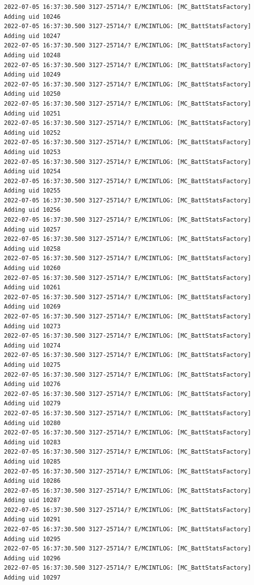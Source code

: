 \documentclass[a4paper,12pt]{book}
\begin{document}
\begin{lstlisting}
2022-07-05 16:37:30.500 3127-25714/? E/MCINTLOG: [MC_BattStatsFactory] Adding uid 10246
2022-07-05 16:37:30.500 3127-25714/? E/MCINTLOG: [MC_BattStatsFactory] Adding uid 10247
2022-07-05 16:37:30.500 3127-25714/? E/MCINTLOG: [MC_BattStatsFactory] Adding uid 10248
2022-07-05 16:37:30.500 3127-25714/? E/MCINTLOG: [MC_BattStatsFactory] Adding uid 10249
2022-07-05 16:37:30.500 3127-25714/? E/MCINTLOG: [MC_BattStatsFactory] Adding uid 10250
2022-07-05 16:37:30.500 3127-25714/? E/MCINTLOG: [MC_BattStatsFactory] Adding uid 10251
2022-07-05 16:37:30.500 3127-25714/? E/MCINTLOG: [MC_BattStatsFactory] Adding uid 10252
2022-07-05 16:37:30.500 3127-25714/? E/MCINTLOG: [MC_BattStatsFactory] Adding uid 10253
2022-07-05 16:37:30.500 3127-25714/? E/MCINTLOG: [MC_BattStatsFactory] Adding uid 10254
2022-07-05 16:37:30.500 3127-25714/? E/MCINTLOG: [MC_BattStatsFactory] Adding uid 10255
2022-07-05 16:37:30.500 3127-25714/? E/MCINTLOG: [MC_BattStatsFactory] Adding uid 10256
2022-07-05 16:37:30.500 3127-25714/? E/MCINTLOG: [MC_BattStatsFactory] Adding uid 10257
2022-07-05 16:37:30.500 3127-25714/? E/MCINTLOG: [MC_BattStatsFactory] Adding uid 10258
2022-07-05 16:37:30.500 3127-25714/? E/MCINTLOG: [MC_BattStatsFactory] Adding uid 10260
2022-07-05 16:37:30.500 3127-25714/? E/MCINTLOG: [MC_BattStatsFactory] Adding uid 10261
2022-07-05 16:37:30.500 3127-25714/? E/MCINTLOG: [MC_BattStatsFactory] Adding uid 10269
2022-07-05 16:37:30.500 3127-25714/? E/MCINTLOG: [MC_BattStatsFactory] Adding uid 10273
2022-07-05 16:37:30.500 3127-25714/? E/MCINTLOG: [MC_BattStatsFactory] Adding uid 10274
2022-07-05 16:37:30.500 3127-25714/? E/MCINTLOG: [MC_BattStatsFactory] Adding uid 10275
2022-07-05 16:37:30.500 3127-25714/? E/MCINTLOG: [MC_BattStatsFactory] Adding uid 10276
2022-07-05 16:37:30.500 3127-25714/? E/MCINTLOG: [MC_BattStatsFactory] Adding uid 10279
2022-07-05 16:37:30.500 3127-25714/? E/MCINTLOG: [MC_BattStatsFactory] Adding uid 10280
2022-07-05 16:37:30.500 3127-25714/? E/MCINTLOG: [MC_BattStatsFactory] Adding uid 10283
2022-07-05 16:37:30.500 3127-25714/? E/MCINTLOG: [MC_BattStatsFactory] Adding uid 10285
2022-07-05 16:37:30.500 3127-25714/? E/MCINTLOG: [MC_BattStatsFactory] Adding uid 10286
2022-07-05 16:37:30.500 3127-25714/? E/MCINTLOG: [MC_BattStatsFactory] Adding uid 10287
2022-07-05 16:37:30.500 3127-25714/? E/MCINTLOG: [MC_BattStatsFactory] Adding uid 10291
2022-07-05 16:37:30.500 3127-25714/? E/MCINTLOG: [MC_BattStatsFactory] Adding uid 10295
2022-07-05 16:37:30.500 3127-25714/? E/MCINTLOG: [MC_BattStatsFactory] Adding uid 10296
2022-07-05 16:37:30.500 3127-25714/? E/MCINTLOG: [MC_BattStatsFactory] Adding uid 10297

\end{lstlisting}
\end{document}
